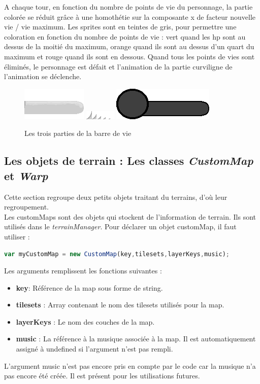 \documentclass[11pt]{article}
\begin{document}
\begin{appendices}
A chaque tour, en fonction du nombre de points de vie du personnage, la partie colorée se réduit grâce à une homothétie sur la composante x de facteur nouvelle vie / vie maximum.  Les sprites sont en teintes de gris, pour permettre une coloration en fonction du nombre de points de vie : vert quand les hp sont au dessus de la moitié du maximum, orange quand ils sont au dessus d'un quart du maximum et rouge quand ils sont en dessous. Quand tous les points de vies sont éliminés, le personnage est défait et l'animation de la partie curviligne de l'animation se déclenche.

\begin{figure}[H]
\includegraphics{health}
\includegraphics{healthP2}
\includegraphics{healthBar}
\caption{Les trois parties de la barre de vie}
\end{figure}
\subsection{Les objets de terrain : Les classes \textit{CustomMap} et \textit{Warp}}
Cette section regroupe deux petits objets traitant du terrains, d'où leur regroupement.\\

Les customMaps sont des objets qui stockent de l'information de terrain. Ils sont utilisés dans le \textit{terrainManager}. Pour déclarer un objet customMap, il faut utiliser : 
\begin{lstlisting}[language=JavaScript]
var myCustomMap = new CustomMap(key,tilesets,layerKeys,music);
\end{lstlisting} 

Les arguments remplissent les fonctions suivantes : 
\begin{itemize}
\item \textbf{key}: Référence de la map sous forme de string.
\item \textbf{tilesets} : Array contenant le nom des tilesets utilisés pour la map.
\item \textbf{layerKeys} : Le nom des couches de la map.
\item \textbf{music} : La référence à la musique associée à la map. Il est automatiquement assigné à undefined si l'argument n'est pas rempli.
\end{itemize}
L'argument music n'est pas encore pris en compte par le code car la musique n'a pas encore été créée. Il est présent pour les utilisations futures. \\


\end{appendices}
\end{document}

